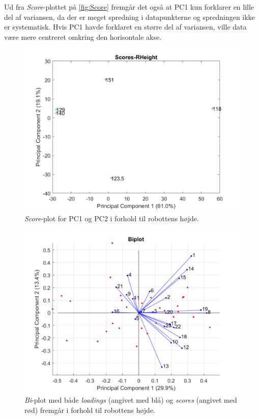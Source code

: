 Ud fra \textit{Score}-plottet på \autoref{fig:Score} fremgår det også at PC1 kun forklarer en lille del af variansen, da der er meget spredning i datapunkterne og spredningen ikke er systematisk. Hvis PC1 havde forklaret en større del af variansen, ville data være mere centreret omkring den horisontale akse.
%
\begin{figure}[H]
\centering
\includegraphics[width=\textwidth]{Figure/DatabehandlingSkalaer/PCAfigures/RHeight-Scores}
\caption{\textit{Score}-plot for PC1 og PC2 i forhold til robottens højde.}
\label{fig:Score}
\end{figure}
\noindent
%


%
\begin{figure}[H]
\centering
\includegraphics[width=\textwidth]{Figure/DatabehandlingSkalaer/PCAfigures/Biplot}
\caption{\textit{Bi}-plot med både \textit{loadings} (angivet med blå) og \textit{scores} (angivet med rød) fremgår i forhold til robottens højde.}
\label{fig:Biplot}
\end{figure}
\noindent
%

